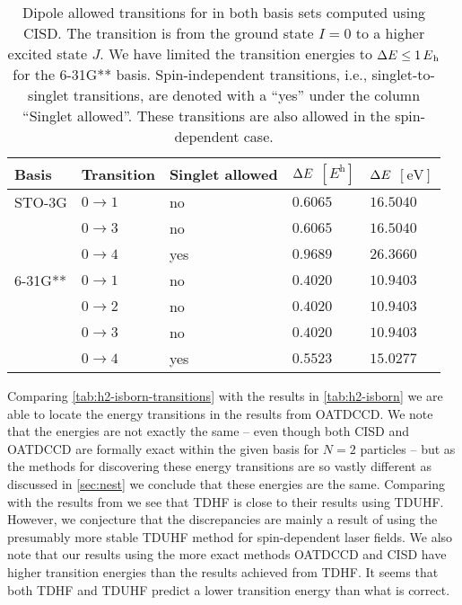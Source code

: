         \begin{table}
            \centering
            \caption{Dipole allowed transitions for  in both basis sets
            computed using CISD.
            The transition is from the ground state $I = 0$ to a higher excited
            state $J$.
            We have limited the transition energies to $\Delta \energy \leq
            \SI{1}{\hartree}$ for the 6-31G** basis.
            Spin-independent transitions, i.e., singlet-to-singlet transitions,
            are denoted with a ``yes'' under the column ``Singlet allowed''.
            These transitions are also allowed in the spin-dependent case.}
            \begin{tabular}{@{}lllll@{}}
                \toprule
                Basis & Transition & Singlet allowed
                & $\Delta E$ $[\si{\hartree}]$
                & $\Delta E$ $[\si{\electronvolt}]$ \\
                \midrule
                STO-3G & $0 \to 1$ & no & $0.6065$ & $16.5040$ \\
                & $0 \to 3$ & no & $0.6065$ & $16.5040$ \\
                & $0 \to 4$ & yes & $0.9689$ & $26.3660$ \\
                6-31G** & $0 \to 1$ & no & $0.4020$ & $10.9403$ \\
                & $0 \to 2$ & no & $0.4020$ & $10.9403$ \\
                & $0 \to 3$ & no & $0.4020$ & $10.9403$ \\
                & $0 \to 4$ & yes & $0.5523$ & $15.0277$ \\
                \bottomrule
            \end{tabular}
            \label{tab:h2-isborn-transitions}
        \end{table}
        Comparing \autoref{tab:h2-isborn-transitions} with the results in
        \autoref{tab:h2-isborn} we are able to locate the energy transitions in the
        results from OATDCCD.
        We note that the energies are not exactly the same -- even though both
        CISD and OATDCCD are formally exact within the given basis for $N = 2$
        particles -- but as the methods for discovering these energy transitions
        are so vastly different as discussed in \autoref{sec:nest} we conclude
        that these energies are the same.
        Comparing with the results from \citeauthor{isborn} \cite{isborn} we see
        that TDHF is close to their results using TDUHF.
        However, we conjecture that the discrepancies are mainly a result of
        \citeauthor{isborn} \cite{isborn} using the presumably more stable TDUHF
        method for spin-dependent laser fields.
        We also note that our results using the more exact methods OATDCCD and
        CISD have higher transition energies than the results achieved from
        TDHF.
        It seems that both TDHF and TDUHF predict a lower transition energy
        than what is correct.

